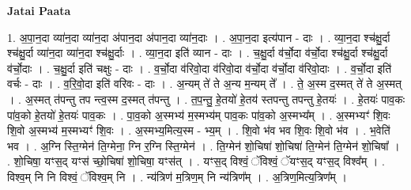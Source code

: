 \documentclass[17pt]{extarticle}
\begin{document}
\textbf{Jatai Paata} \newline

1. अ॒पा॒न॒दा व्या॑न॒दा व्या॑न॒दा अ॑पान॒दा अ॑पान॒दा व्या॑न॒दाः । . अ॒पा॒न॒दा इत्य॑पान - दाः । . व्या॒न॒दा श्च॑क्षु॒र्दा श्च॑क्षु॒र्दा व्या॑न॒दा व्या॑न॒दा श्च॑क्षु॒र्दाः । . व्या॒न॒दा इति॑ व्यान - दाः । . च॒क्षु॒र्दा व॑र्चो॒दा व॑र्चो॒दा श्च॑क्षु॒र्दा श्च॑क्षु॒र्दा व॑र्चो॒दाः । . च॒क्षु॒र्दा इति॑ चक्षुः - दाः । . व॒र्चो॒दा व॑रिवो॒दा व॑रिवो॒दा व॑र्चो॒दा व॑र्चो॒दा व॑रिवो॒दाः । . व॒र्चो॒दा इति॑ वर्चः - दाः । . व॒रि॒वो॒दा इति॑ वरिवः - दाः । . अ॒न्यम् ते॑ ते अ॒न्य म॒न्यम् ते᳚ । . ते॒ अ॒स्म द॒स्मत् ते॑ ते अ॒स्मत् । . अ॒स्मत् त॑पन्तु तप न्त्व॒स्म द॒स्मत् त॑पन्तु । . त॒प॒न्तु॒ हे॒तयो॑ हे॒तय॑ स्तपन्तु तपन्तु हे॒तयः॑ । . हे॒तयः॑ पाव॒कः पा॑व॒को हे॒तयो॑ हे॒तयः॑ पाव॒कः । . पा॒व॒को अ॒स्मभ्य॑ म॒स्मभ्य॑म् पाव॒कः पा॑व॒को अ॒स्मभ्य᳚म् । . अ॒स्मभ्यꣳ॑ शि॒वः शि॒वो अ॒स्मभ्य॑ म॒स्मभ्यꣳ॑ शि॒वः । . अ॒स्मभ्य॒मित्य॒स्म - भ्य॒म् । . शि॒वो भ॑व भव शि॒वः शि॒वो भ॑व । . भ॒वेति॑ भव । . अ॒ग्नि स्ति॒ग्मेन॑ ति॒ग्मेना॒ ग्नि र॒ग्नि स्ति॒ग्मेन॑ । . ति॒ग्मेन॑ शो॒चिषा॑ शो॒चिषा॑ ति॒ग्मेन॑ ति॒ग्मेन॑ शो॒चिषा᳚ । . शो॒चिषा॒ यꣳस॒द् यꣳस॑ च्छो॒चिषा॑ शो॒चिषा॒ यꣳस॑त् । . यꣳस॒द् विश्वं॒ ॅविश्वं॒ ॅयꣳस॒द् यꣳस॒द् विश्व᳚म् । . विश्व॒म् नि नि विश्वं॒ ॅविश्व॒म् नि । . न्य॑त्रिण॑ म॒त्रिण॒म् नि न्य॑त्रिण᳚म् । . अ॒त्रिण॒मित्य॒त्रिण᳚म् । \newline
\end{document}
